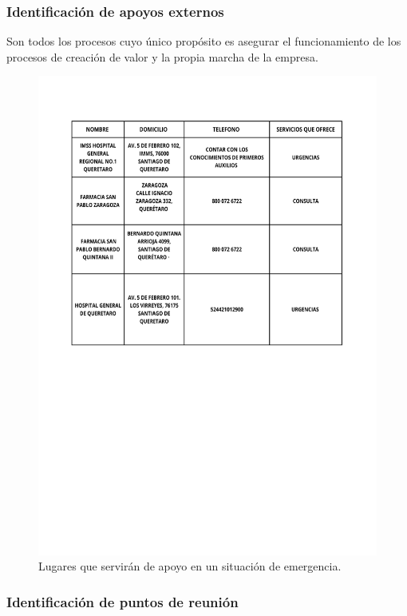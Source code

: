     \subsubsection{ Identificación de apoyos externos}
    Son todos los procesos cuyo único propósito es asegurar el funcionamiento de los procesos de creación de valor y la propia marcha de la empresa.\cite{GP}
    \begin{figure}[H]
        \centering
        \includegraphics[scale=0.5]{9/Img/apoyosExternos.pdf}
        \caption{Lugares que servirán de apoyo en un situación de emergencia.}
        \label{fig:mapa-itq}
    \end{figure}
    \subsubsection{Identificación de puntos de reunión}
    
